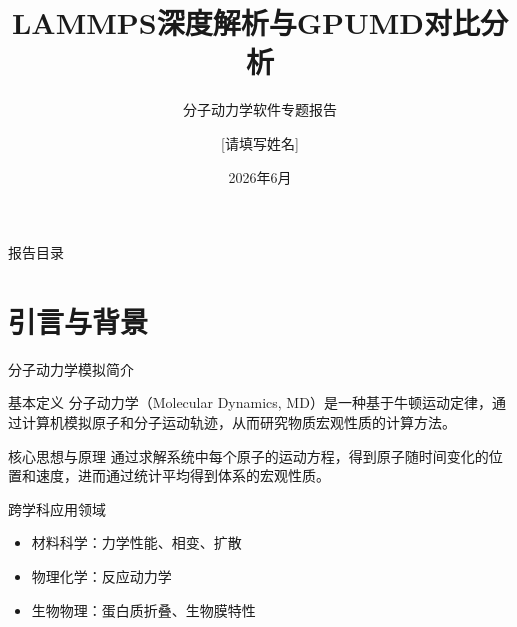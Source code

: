 \documentclass{beamer}
\title{LAMMPS深度解析与GPUMD对比分析}
\subtitle{分子动力学软件专题报告}
\author{[请填写姓名]}
\date{2026年6月}
\begin{document}
\begin{frame}
    \titlepage
\end{frame}

\begin{frame}{报告目录}
    \tableofcontents
\end{frame}

\section{引言与背景}

\begin{frame}{分子动力学模拟简介}
    \begin{block}{基本定义}
        分子动力学（Molecular Dynamics, MD）是一种基于牛顿运动定律，通过计算机模拟原子和分子运动轨迹，从而研究物质宏观性质的计算方法。
    \end{block}
    \begin{block}{核心思想与原理}
        通过求解系统中每个原子的运动方程，得到原子随时间变化的位置和速度，进而通过统计平均得到体系的宏观性质。
    \end{block}
    \begin{block}{跨学科应用领域}
        \begin{itemize}
            \item 材料科学：力学性能、相变、扩散
            \item 物理化学：反应动力学
            \item 生物物理：蛋白质折叠、生物膜特性
        \end{itemize}
    \end{block}
\end{frame}
\end{document}

